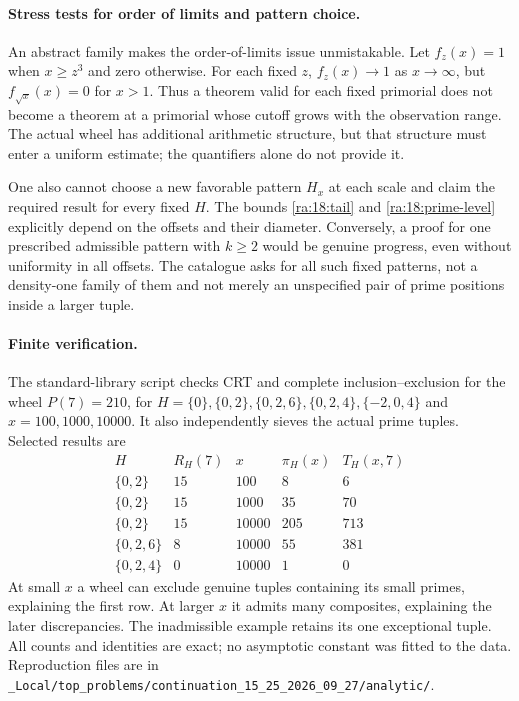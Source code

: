 \documentclass[11pt]{article}
\begin{document}
\paragraph{Stress tests for order of limits and pattern choice.}
An abstract family makes the order-of-limits issue unmistakable. Let
$f_z(x)=1$ when $x\ge z^3$ and zero otherwise. For each fixed $z$,
$f_z(x)\to1$ as $x\to\infty$, but $f_{\sqrt x}(x)=0$ for $x>1$.
Thus a theorem valid for each fixed primorial does not become a theorem
at a primorial whose cutoff grows with the observation range. The actual
wheel has additional arithmetic structure, but that structure must enter
a uniform estimate; the quantifiers alone do not provide it.

One also cannot choose a new favorable pattern $H_x$ at each scale and
claim the required result for every fixed $H$. The bounds
\eqref{ra:18:tail} and \eqref{ra:18:prime-level} explicitly depend on
the offsets and their diameter. Conversely, a proof for one prescribed
admissible pattern with $k\ge2$ would be genuine progress, even without
uniformity in all offsets. The catalogue asks for all such fixed patterns,
not a density-one family of them and not merely an unspecified pair of
prime positions inside a larger tuple.

\paragraph{Finite verification.}
The standard-library script checks CRT and complete inclusion--exclusion
for the wheel $P(7)=210$, for $H=\{0\},\{0,2\},\{0,2,6\},
\{0,2,4\},\{-2,0,4\}$ and $x=100,1000,10000$.
It also independently sieves the actual prime tuples. Selected results are
\[
\begin{array}{c|r|r|r|r}
H&R_H(7)&x&\pi_H(x)&T_H(x,7)\\\hline
\{0,2\}&15&100&8&6\\
\{0,2\}&15&1000&35&70\\
\{0,2\}&15&10000&205&713\\
\{0,2,6\}&8&10000&55&381\\
\{0,2,4\}&0&10000&1&0
\end{array}
\]
At small $x$ a wheel can exclude genuine tuples containing its small
primes, explaining the first row. At larger $x$ it admits many composites,
explaining the later discrepancies. The inadmissible example retains its
one exceptional tuple. All counts and identities are exact; no asymptotic
constant was fitted to the data. Reproduction files are in
\texttt{\_Local/top\_problems/continuation\_15\_25\_2026\_09\_27/analytic/}.
\end{document}
